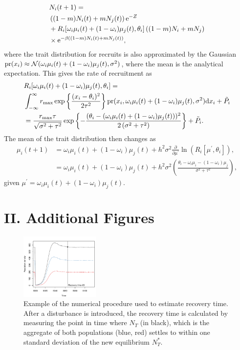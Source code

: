 \documentclass{revtex4}
\begin{document}
\begin{align}
  &N_i(t+1) = \\ \nonumber
  &\left((1-m)N_i(t) + m N_j(t) \right){\rm e}^{-Z} \\ \nonumber
  &+ R_i[\omega_i\mu_i(t) + (1-\omega_i)\mu_j(t),\theta_i]\left((1-m)N_i + mN_j\right) \\ \nonumber
  &\times {\rm e}^{-\beta ((1-m)N_i(t) + m N_j(t))},
  \label{eq:N}
\end{align}
where the trait distribution for recruits is also approximated by the Gaussian 
${\rm pr}(x_i) \approx \mathcal{N}(\omega_i\mu_i(t) + (1-\omega_i)\mu_j(t),\sigma^2)$, where the mean is the analytical expectation.
This gives the rate of recruitment as 
\begin{align}
  &R_i[\omega_i\mu_i(t) + (1-\omega_i)\mu_j(t),\theta_i] = \\ \nonumber
  &\int_{-\infty}^\infty r_{\rm max}\exp\left\{\frac{(x_i-\theta_i)^2}{2\tau^2}\right\} {\rm pr}(x_i,\omega_i\mu_i(t) + (1-\omega_i)\mu_j(t),\sigma^2) {\rm d}x_i +\tilde{P}_i\\ \nonumber
  &= \frac{r_{\rm max} \tau  }{\sqrt{\sigma ^2+\tau ^2}}\exp\left\{-\frac{(\theta_i-(\omega_i\mu_i(t) + (1-\omega_i)\mu_j(t)))^2}{2 \left(\sigma ^2+\tau ^2\right)}\right\} +\tilde{P}_i.
\end{align}
The mean of the trait distribution then changes as
\begin{align}
  \label{eq:mu}
  \mu_i(t+1) &= \omega_i\mu_i(t) + (1-\omega_i)\mu_j(t) + h^2\sigma^2\frac{\partial}{\partial \mu^\prime}\ln\left(R_i[\mu^\prime,\theta_i] \right), \\ \nonumber
  &= \omega_i\mu_i(t) + (1-\omega_i)\mu_j(t) + h^2\sigma^2\left(\frac{\theta_i - \omega_i\mu_i - (1-\omega_i)\mu_j}{\sigma^2+\tau^2} \right),
\end{align}
given $\mu^\prime = \omega_i \mu_i(t)+ (1-\omega_i)\mu_j(t)$.




\clearpage


\section*{II. Additional Figures}


\begin{figure}
  \captionsetup{justification=raggedright,
singlelinecheck=false
}
\centering
\includegraphics[width=0.35\textwidth]{fig_recovery.pdf}
\caption{
Example of the numerical procedure used to estimate recovery time. After a disturbance is introduced, the recovery time is calculated by measuring the point in time where $N_T$ (in black), which is the aggregate of both populations (blue, red) settles to within one standard deviation of the new equilibrium $N_T^*$. 
} \label{fig:recovery}
\end{figure}
\end{document}
